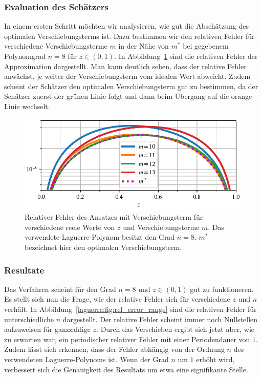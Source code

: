 \subsubsection{Evaluation des Schätzers}
In einem ersten Schritt möchten wir analysieren,
wie gut die Abschätzung des optimalen Verschiebungsterms ist.
Dazu bestimmen wir den relativen Fehler für verschiedene Verschiebungsterme $m$
in der Nähe von $m^*$ bei gegebenem Polynomgrad $n = 8$ für $z \in (0, 1)$.
In Abbildung~\ref{laguerre:fig:rel_error_shifted} sind die relativen Fehler
der Approximation dargestellt.
Man kann deutlich sehen,
dass der relative Fehler anwächst,
je weiter der Verschiebungsterm vom idealen Wert abweicht.
Zudem scheint der Schätzer den optimalen Verschiebungsterm gut zu bestimmen,
da der Schätzer zuerst der grünen Linie folgt und
dann beim Übergang auf die orange Linie wechselt.
\begin{figure}
\centering
% 
\includegraphics{papers/laguerre/images/rel_error_shifted.pdf}
\caption{Relativer Fehler des Ansatzes mit Verschiebungsterm
für verschiedene reele Werte von $z$ und Verschiebungsterme $m$.
Das verwendete Laguerre-Polynom besitzt den Grad $n = 8$.
$m^*$ bezeichnet hier den optimalen Verschiebungsterm.}
\label{laguerre:fig:rel_error_shifted}
\end{figure}

\subsubsection{Resultate}
Das Verfahren scheint für den Grad $n=8$ und $z \in (0,1)$ gut zu funktioneren.
Es stellt sich nun die Frage,
wie der relative Fehler sich für verschiedene $z$ und $n$ verhält.
In Abbildung~\ref{laguerre:fig:rel_error_range} sind die relativen Fehler für
unterschiedliche $n$ dargestellt.
Der relative Fehler scheint immer noch Nullstellen aufzuweisen
für ganzzahlige $z$.
Durch das Verschieben ergibt sich jetzt aber,
wie zu erwarten war,
ein periodischer relativer Fehler mit einer Periodendauer von $1$.
Zudem lässt sich erkennen,
dass der Fehler abhängig von der Ordnung $n$
des verwendeten Laguerre-Polynoms ist.
Wenn der Grad $n$ um $1$ erhöht wird,
verbessert sich die Genauigkeit des Resultats um etwa eine signifikante Stelle.

